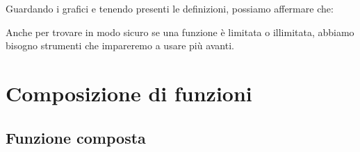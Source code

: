 \begin{esempio}
Guardando i grafici e tenendo presenti le definizioni, possiamo affermare che:

\vspace{1em}

\vspace{1.5em}
\end{esempio}

\begin{osservazione}
Anche per trovare in modo sicuro se una funzione è limitata o illimitata, 
abbiamo bisogno strumenti che impareremo a usare più avanti.
\end{osservazione}


\section{Composizione di funzioni}

\subsection{Funzione composta}

